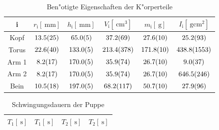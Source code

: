 				\begin{table}[h!]
					\begin{center}
						\label{tabelle:puppeneigenschaften}
						\caption{Ben"otigte Eigenschaften der K"orperteile}
						\begin{tabular}{|c||c|c|c|c|c|}
							\hline
								i &
								$r_\mathrm{i} [\SI{}{\milli \meter}]$ &
								$h_\mathrm{i} [\SI{}{\milli \meter}]$ &
								$V_\mathrm{i} [\SI{}{\centi \meter \cubed}]$ &
								$m_\mathrm{i} [\SI{}{\gram}]$ &
								$I_\mathrm{i} [\SI{}{\gram \centi \meter \squared}]$ \\
							\hline 
							\hline
								Kopf &
								$\SI{13.5 (25)}{} $ &
								$\SI{65.0 (5)}{}$ &
								$\SI{37.2 (69)}{}$&
								$\SI{27.6 (10)}{}$&
								$\SI{25.2 (93)}{}$\\
							\hline 
								Torus &
								$\SI{22.6 (40)}{} $ &
								$\SI{133.0 (5)}{}$ &
								$\SI{213.4 (378)}{}$&
								$\SI{171.8 (10)}{}$&
								$\SI{438.8 (1553)}{}$\\
							\hline 
								Arm 1 &
								$\SI{8.2 (17)}{}$ &
								$\SI{170.0 (5)}{}$ &
								$\SI{35.9 (74)}{}$&
								$\SI{26.7 (10)}{}$&
								$\SI{9.0 (37)}{}$\\
							\hline 
								Arm 2 &
								$\SI{8.2 (17)}{}$ &
								$\SI{170.0 (5)}{}$ &
								$\SI{35.9 (74)}{}$&
								$\SI{26.7 (10)}{}$&
								$\SI{646.5 (246)}{}$\\
							\hline 
								Bein &
								$\SI{10.5 (18)}{}  $& 
								$\SI{197.0 (5)}{}$ &
								$\SI{68.2 (117)}{}$&
								$\SI{50.7 (10)}{}$&
								$\SI{27.9 (96)}{}$\\
							\hline 
						\end{tabular}
					\end{center}
				\end{table}

				\begin{table}[h!]
					\begin{center}
						\label{tabelle:puppe}
						\caption{Schwingungsdauern der Puppe}
						\begin{tabular}{|c||c||c||c|}
							\hline
							$T_1 [\SI{}{\second}]$ & $T_1 [\SI{}{\second}]$ & $T_2 [\SI{}{\second}]$ & $T_2 [\SI{}{\second}]$ \\
							\hline 
							\hline
							
							\hline 
						\end{tabular}
					\end{center}
				\end{table}

				\clearpage
